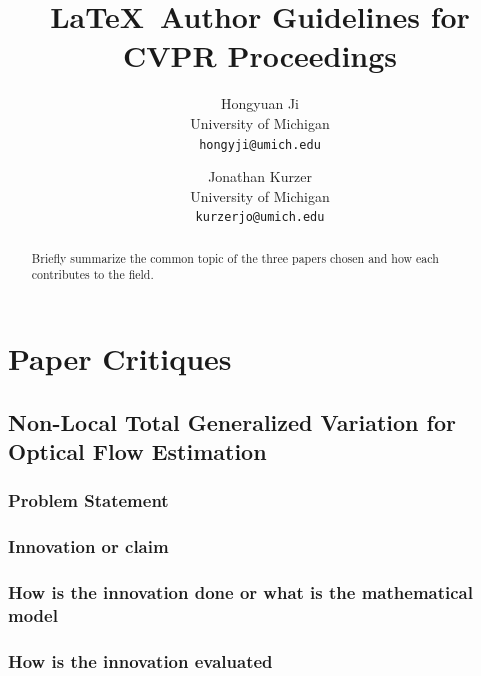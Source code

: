 \documentclass[10pt,twocolumn,letterpaper]{article}
\begin{document}
\title{\LaTeX\ Author Guidelines for CVPR Proceedings}

\author{
Hongyuan Ji\\
University of Michigan\\
{\tt\small hongyji@umich.edu}
\and
Jonathan Kurzer\\
University of Michigan\\
{\tt\small kurzerjo@umich.edu}
}

\maketitle

\begin{abstract}
   Briefly summarize the common topic of the three papers chosen and how each contributes to the field.
\end{abstract}

\section{Paper Critiques}
\lipsum[1]

\subsection{Non-Local Total Generalized Variation for Optical Flow Estimation ~\cite{ranftl2014non}}

\subsubsection{Problem Statement}
\lipsum[1]

\subsubsection{Innovation or claim}
\lipsum[1]

\subsubsection{How is the innovation done or what is the mathematical model}
\lipsum[1]

\subsubsection{How is the innovation evaluated}
\lipsum[1]
\end{document}

